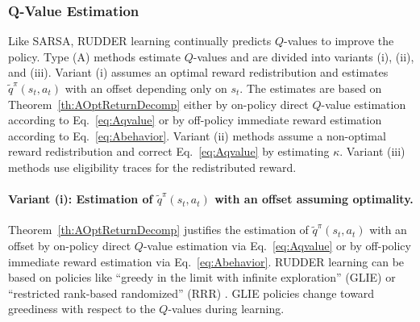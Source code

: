 \documentclass{article}
\begin{document}
\begin{appendices}
\subsubsection{Q-Value Estimation}
\label{sec:QestimateA}
Like SARSA, RUDDER learning continually predicts 
$Q$-values to improve the policy. 
Type (A) methods estimate $Q$-values and are divided 
into variants (i), (ii), and (iii).
Variant (i) assumes an optimal reward redistribution
and estimates $\tilde{q}^\pi(s_t,a_t)$ with an offset
depending only on $s_t$.
The estimates are based on Theorem~\ref{th:AOptReturnDecomp}
either by on-policy direct $Q$-value estimation according to Eq.~\eqref{eq:Aqvalue}
or by off-policy immediate reward estimation according to Eq.~\eqref{eq:Abehavior}.
Variant (ii) methods assume a non-optimal reward redistribution and 
correct Eq.~\eqref{eq:Aqvalue} by estimating $\kappa$.
Variant (iii) methods use eligibility traces for the redistributed reward.






\paragraph{Variant (i): Estimation of $\tilde{q}^\pi(s_t,a_t)$ 
with an offset assuming optimality.}
Theorem~\ref{th:AOptReturnDecomp} justifies the estimation
of $\tilde{q}^\pi(s_t,a_t)$ with an offset
by on-policy direct $Q$-value estimation via Eq.~\eqref{eq:Aqvalue} or 
by off-policy immediate reward estimation via Eq.~\eqref{eq:Abehavior}.
RUDDER learning can be based on policies like
``greedy in the limit with infinite exploration'' (GLIE) or
``restricted rank-based randomized'' (RRR) \cite{Singh:00}. 
GLIE policies change toward greediness with respect to the $Q$-values
during learning.




\end{appendices}
\end{document}

